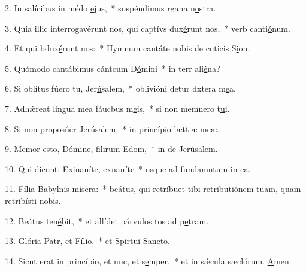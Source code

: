 2. In salícibus in médo \uline{e}jus,~* suspéndimus rgana n\uline{o}stra.\par 
3. Quia illic interrogavérunt nos, qui captívs dux\uline{é}runt nos,~* verb canti\uline{ó}num.\par 
4. Et qui bdux\uline{é}runt nos:~* Hymnum cantáte nobis de cnticis S\uline{i}on.\par 
5. Quómodo cantábimus cántcum D\uline{ó}mini~* in terr ali\uline{é}na?\par 
6. Si oblítus fúero tu, Jer\uline{ú}salem,~* oblivióni detur dxtera m\uline{e}a.\par 
7. Adhǽreat lingua mea fáucbus m\uline{e}is,~* si non memnero t\uline{u}i.\par 
8. Si non proposúer Jer\uline{ú}salem,~* in princípio lættiæ m\uline{e}æ.\par 
9. Memor esto, Dómine, filirum \uline{E}dom,~* in de Jer\uline{ú}salem.\par 
10. Qui dicunt: Exinaníte, exnan\uline{í}te~* usque ad fundamntum in \uline{e}a.\par 
11. Fília Babylnis m\uline{í}sera:~* beátus, qui retríbuet tibi retributiónem tuam, quam retribísti n\uline{o}bis.\par 
12. Beátus  ten\uline{é}bit,~* et allídet párvulos tos ad p\uline{e}tram.\par 
13. Glória Patr, et F\uline{í}lio,~* et Spirtui S\uline{a}ncto.\par 
14. Sicut erat in princípio, et nnc, et s\uline{e}mper,~* et in sǽcula sæclórum. \uline{A}men.\par 
